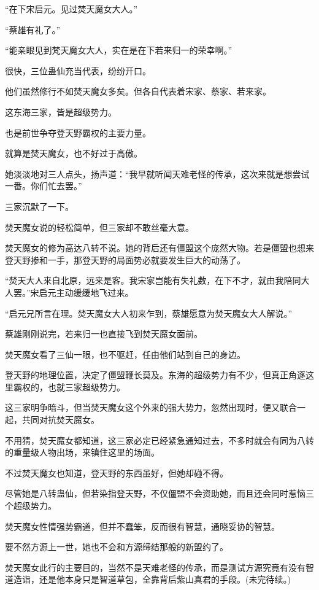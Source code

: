 \begin{this_body}
“在下宋启元。见过焚天魔女大人。”

“蔡雄有礼了。”

“能亲眼见到梵天魔女大人，实在是在下若来归一的荣幸啊。”

很快，三位蛊仙充当代表，纷纷开口。

他们虽然修行不如焚天魔女多矣。但各自代表着宋家、蔡家、若来家。

这东海三家，皆是超级势力。

也是前世争夺登天野霸权的主要力量。

就算是焚天魔女，也不好过于高傲。

她淡淡地对三人点头，扬声道：“我早就听闻天难老怪的传承，这次来就是想尝试一番。你们忙去罢。”

三家沉默了一下。

焚天魔女说的轻松简单，但三家却不敢丝毫大意。

焚天魔女的修为高达八转不说。她的背后还有僵盟这个庞然大物。若是僵盟也想来登天野掺和一手，那登天野的局面势必就要发生巨大的动荡了。

“焚天大人来自北原，远来是客。我宋家岂能有失礼数，在下不才，就由我陪同大人罢。”宋启元主动缓缓地飞过来。

“启元兄所言在理。焚天魔女大人初来乍到，蔡雄愿意为焚天魔女大人解说。”

蔡雄刚刚说完，若来归一也直接飞到焚天魔女面前。

焚天魔女看了三仙一眼，也不驱赶，任由他们站到自己的身边。

登天野的地理位置，决定了僵盟鞭长莫及。东海的超级势力有不少，但真正角逐这里霸权的，也就三家超级势力。

这三家明争暗斗，但当焚天魔女这个外来的强大势力，忽然出现时，便又联合一起，共同对抗焚天魔女。

不用猜，焚天魔女都知道，这三家必定已经紧急通知过去，不多时就会有同为八转的重量级人物出场，来镇住这里的场面。

不过焚天魔女也知道，登天野的东西虽好，但她却碰不得。

尽管她是八转蛊仙，但若染指登天野，不仅僵盟不会资助她，而且还会同时惹恼三个超级势力。

焚天魔女性情强势霸道，但并不蠢笨，反而很有智慧，通晓妥协的智慧。

要不然方源上一世，她也不会和方源缔结那般的新盟约了。

焚天魔女此行的主要目的，当然不是天难老怪的传承，而是测试方源究竟有没有智道造诣，还是他本身只是智道草包，全靠背后紫山真君的手段。(未完待续。)

\end{this_body}

